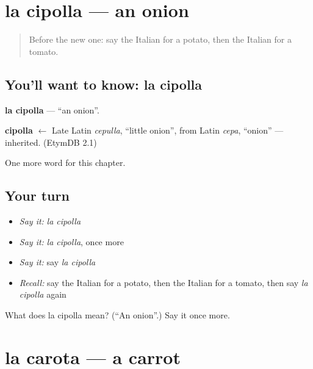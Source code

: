 \section[la cipolla]{la cipolla — an onion}

\label{lesson:IT-C53-cipolla}



\begin{quote}
Before the new one: say the Italian for a potato, then the Italian for a tomato.
\end{quote}

\subsection*{You'll want to know: la cipolla}
\textbf{la cipolla} — \textquotedblleft{}an onion\textquotedblright{}.

\begin{cousinweb}
\textbf{cipolla} $\leftarrow$ Late Latin \emph{cepulla}, \textquotedblleft{}little onion\textquotedblright{}, from Latin \emph{cepa}, \textquotedblleft{}onion\textquotedblright{} — inherited. (EtymDB 2.1)
\end{cousinweb}

\begin{grammarlens}[title={What you've built}]
One more word for this chapter.
\end{grammarlens}

\subsection*{Your turn}
\begin{itemize}
\raggedright
  \item \emph{Say it:} \emph{la cipolla}
  \item \emph{Say it:} \emph{la cipolla}, once more
  \item \emph{Say it:} say \emph{la cipolla}
  \item \emph{Recall:} say the Italian for a potato, then the Italian for a tomato, then say \emph{la cipolla} again
\end{itemize}

\begin{tcolorbox}[breakable,colback=teal!4,colframe=teal!35!black,title={Before you move on}]
What does la cipolla mean? (\textquotedblleft{}An onion\textquotedblright{}.) Say it once more.
\end{tcolorbox}
\section[la carota]{la carota — a carrot}

